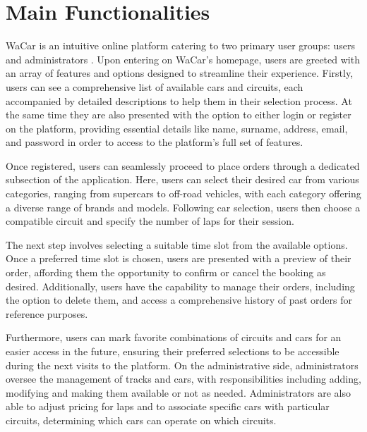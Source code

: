 \section{Main Functionalities}


WaCar is an intuitive online platform catering to two primary user groups: users and administrators . Upon entering on WaCar's homepage, users are greeted with an array of features and options designed to streamline their experience. Firstly, users can see a comprehensive list of available cars and circuits, each accompanied by detailed descriptions to help them in their selection process. At the same time they are also presented with the option to either login or register on the platform, providing essential details like name, surname, address, email, and password in order to access to the platform's full set of features.

Once registered, users can seamlessly proceed to place orders through a dedicated subsection of the application. Here, users can select their desired car from various categories, ranging from supercars to off-road vehicles, with each category offering a diverse range of brands and models. Following car selection, users then choose a compatible circuit and specify the number of laps for their session.

The next step involves selecting a suitable time slot from the available options. Once a preferred time slot is chosen, users are presented with a preview of their order, affording them the opportunity to confirm or cancel the booking as desired. Additionally, users have the capability to manage their orders, including the option to delete them, and access a comprehensive history of past orders for reference purposes.

Furthermore, users can mark favorite combinations of circuits and cars for an easier access in the future, ensuring their preferred selections to be accessible during the next visits to the platform.
On the administrative side, administrators oversee the management of tracks and cars, with responsibilities including adding, modifying and making them available or not as needed. Administrators are also able to adjust pricing for laps and to associate specific cars with particular circuits, determining which cars can operate on which circuits.